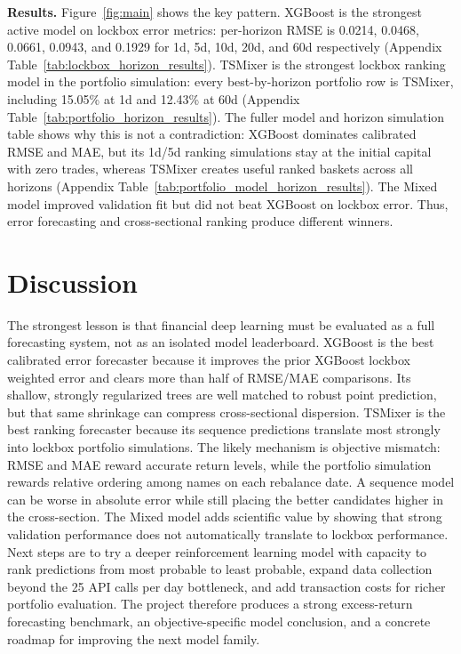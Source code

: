 \documentclass[sigconf,nonacm]{acmart}
\begin{document}
\textbf{Results.} Figure~\ref{fig:main} shows the key pattern. XGBoost is the strongest active model on lockbox error metrics: per-horizon RMSE is 0.0214, 0.0468, 0.0661, 0.0943, and 0.1929 for 1d, 5d, 10d, 20d, and 60d respectively (Appendix Table~\ref{tab:lockbox_horizon_results}). TSMixer is the strongest lockbox ranking model in the portfolio simulation: every best-by-horizon portfolio row is TSMixer, including 15.05\% at 1d and 12.43\% at 60d (Appendix Table~\ref{tab:portfolio_horizon_results}). The fuller model and horizon simulation table shows why this is not a contradiction: XGBoost dominates calibrated RMSE and MAE, but its 1d/5d ranking simulations stay at the initial capital with zero trades, whereas TSMixer creates useful ranked baskets across all horizons (Appendix Table~\ref{tab:portfolio_model_horizon_results}). The Mixed model improved validation fit but did not beat XGBoost on lockbox error. Thus, error forecasting and cross-sectional ranking produce different winners.

\section{Discussion}
The strongest lesson is that financial deep learning must be evaluated as a full forecasting system, not as an isolated model leaderboard. XGBoost is the best calibrated error forecaster because it improves the prior XGBoost lockbox weighted error and clears more than half of RMSE/MAE comparisons. Its shallow, strongly regularized trees are well matched to robust point prediction, but that same shrinkage can compress cross-sectional dispersion. TSMixer is the best ranking forecaster because its sequence predictions translate most strongly into lockbox portfolio simulations. The likely mechanism is objective mismatch: RMSE and MAE reward accurate return levels, while the portfolio simulation rewards relative ordering among names on each rebalance date. A sequence model can be worse in absolute error while still placing the better candidates higher in the cross-section. The Mixed model adds scientific value by showing that strong validation performance does not automatically translate to lockbox performance. Next steps are to try a deeper reinforcement learning model with capacity to rank predictions from most probable to least probable, expand data collection beyond the 25 API calls per day bottleneck, and add transaction costs for richer portfolio evaluation. The project therefore produces a strong excess-return forecasting benchmark, an objective-specific model conclusion, and a concrete roadmap for improving the next model family.
\end{document}
